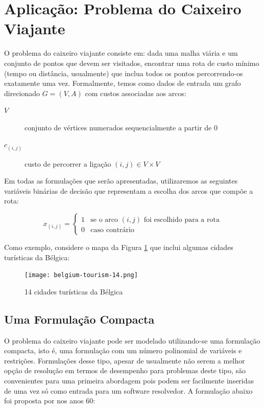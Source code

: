 \documentclass[a4paper,11pt,fleqn]{article}
\begin{document}
\section{Aplicação: Problema do Caixeiro Viajante}

O problema do caixeiro viajante consiste em: dada uma malha viária
e um conjunto de pontos que devem ser visitados, encontrar uma rota
de custo mínimo (tempo ou distância, usualmente) que inclua todos os pontos percorrendo-os exatamente uma vez. Formalmente, temos como dados de entrada um grafo direcionado $G=(V,A)$ com custos associadas aos arcos:
\begin{description}
	\item [{$V$}] conjunto de vértices numerados sequencialmente a partir
	de 0
	\item [{$c_{(i,j)}$}] custo de percorrer a ligação $(i, j) \in V \times V $
\end{description}

Em todas as formulações que serão apresentadas, utilizaremos as seguintes
variáveis binárias de decisão que representam a escolha dos arcos
que compõe a rota:

\[
x_{(i,j)}=\begin{cases}
1 & \textrm{se o arco }(i,j)\textrm{ foi escolhido para a rota}\\
0 & \textrm{caso contrário}
\end{cases}
\]

Como exemplo, considere o mapa da Figura \ref{figG} que inclui algumas cidades turísticas da Bélgica:

\begin{figure}
	\begin{centering}
		\texttt{[image: belgium-tourism-14.png]}
		\par\end{centering}
	\caption{14 cidades turísticas da Bélgica}	
	\label{figG}
\end{figure}


\subsection{Uma Formulação Compacta}

O problema do caixeiro viajante pode ser modelado utilizando-se uma
formulação compacta, isto é, uma formulação com um número polinomial
de variáveis e restrições. Formulações desse tipo, apesar de usualmente não serem a melhor opção de resolução em termos de desempenho para problemas
deste tipo, são convenientes para uma primeira abordagem pois podem
ser facilmente inseridas de uma vez só como entrada para um software
resolvedor. A formulação abaixo foi proposta por \cite{Miller1960} nos
anos 60:
\end{document}
